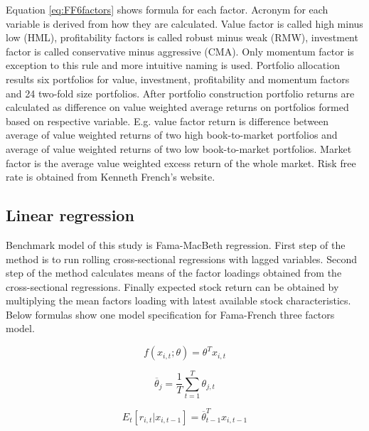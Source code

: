 \documentclass{article}
\begin{document}
Equation \ref{eq:FF6factors} shows formula for each factor. Acronym for each variable is derived from how they are calculated. Value factor is called high minus low (HML), profitability factors is called robust minus weak (RMW), investment factor is called conservative minus aggressive (CMA). Only momentum factor is exception to this rule and more intuitive naming is used. Portfolio allocation results six portfolios for value, investment, profitability and momentum factors and 24 two-fold size portfolios. After portfolio construction portfolio returns are calculated as difference on value weighted average returns on portfolios formed based on respective variable. E.g. value factor return is difference between average of value weighted returns of two high book-to-market portfolios and average of value weighted returns of two low book-to-market portfolios. Market factor is the average value weighted excess return of the whole market. Risk free rate is obtained from Kenneth French's website.

\subsection{Linear regression}\label{LinearRegression}
Benchmark model of this study is Fama-MacBeth \citeyear{FamaMacBeth1973} regression. First step of the method is to run rolling cross-sectional regressions with lagged variables. Second step of the method calculates means of the factor loadings obtained from the cross-sectional regressions. Finally expected stock return can be obtained by multiplying the mean factors loading with latest available stock characteristics. Below formulas show one model specification for Fama-French \citeyear{FAMA19933} three factors model.

\begin{equation}
f(x_{i, t}; \theta) = \theta^T x_{i, t}
\end{equation}

\begin{equation}
\overline \theta_j = \frac{1}{T} \sum^{T}_{t=1}\theta_{j, t}
\end{equation}

\begin{equation}
E_t \left[ r_{i, t} | x_{i, t-1} \right] = \overline \theta_{t-1}^T x_{i, t-1}
\end{equation}
\end{document}
